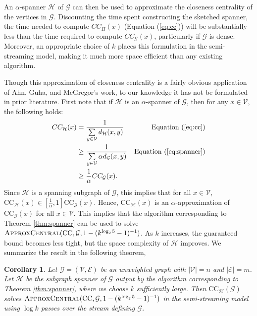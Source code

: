 \documentclass{report}
\newtheorem{corollary}[theorem]{Corollary}
\newcommand{\algoname}[1]{\textnormal{\textsc{#1}}}
\begin{document}
An $\alpha$-spanner $\mathcal{H}$ of $\mathcal{G}$ can then be used to approximate the closeness centrality of the vertices in $\mathcal{G}$.
Discounting the time spent constructing the sketched spanner, the time needed to compute $CC_H(x)$ (Equation (\ref{eq:cc})) will be substantially less than the time required to compute $CC_\mathcal{G}(x)$, particularly if $\mathcal{G}$ is dense. 
Moreover, an appropriate choice of $k$ places this formulation in the semi-streaming model, making it much more space efficient than any existing algorithm.

Though this approximation of closeness centrality is a fairly obvious application of Ahn, Guha, and McGregor's work, to our knowledge it has not be formulated in prior literature. 
First note that if $\mathcal{H}$ is an $\alpha$-spanner of $\mathcal{G}$, then for any $x \in \mathcal{V}$, the following holds:
%
\begin{align*}
CC_\mathcal{H}(x) 
&= \frac{1}{\sum\limits_{y \in \mathcal{V}} d_\mathcal{H}(x,y)}
&\textrm{Equation (\ref{eq:cc}})\\
&\geq \frac{1}{\sum\limits_{y \in \mathcal{V}} \alpha d_\mathcal{G}(x,y)}
&\textrm{Equation (\ref{eq:spanner}})\\
&\geq \frac{1}{\alpha}CC_\mathcal{G}(x).
\end{align*}
%
Since $\mathcal{H}$ is a spanning subgraph of $\mathcal{G}$, this implies that for all $x \in \mathcal{V}$, $\textrm{CC}_\mathcal{H}(x) \in [\frac{1}{\alpha},1]\textrm{CC}_\mathcal{G}(x)$. 
Hence, $\textrm{CC}_\mathcal{H}(x)$ is an $\alpha$-approximation of $\textrm{CC}_\mathcal{G}(x)$ for all $x \in \mathcal{V}$. 
This implies that the algorithm corresponding to Theorem \ref{thm:spanner} can be used to solve $\algoname{ApproxCentral}(\textrm{CC}, \mathcal{G}, 1- (k^{\log_2 5}-1)^{-1})$.
As $k$ increases, the guaranteed bound becomes less tight, but the space complexity of $\mathcal{H}$ improves. 
We summarize the result in the following theorem,
%
\begin{corollary} \label{cor:ccapprox}
Let $\mathcal{G} = (\mathcal{V}, \mathcal{E})$ be an unweighted graph with $|\mathcal{V}| = n$ and $|\mathcal{E}|=m$. 
Let $\mathcal{H}$ be the subgraph spanner of $\mathcal{G}$ output by the algorithm corresponding to Theorem \ref{thm:spanner}, where we choose $k$ sufficiently large.
Then $\textrm{CC}_\mathcal{H}(\mathcal{G})$ solves $\algoname{ApproxCentral}(\textrm{CC},\mathcal{G}, 1- (k^{\log_2 5}-1)^{-1})$ in the semi-streaming model using $\log k$ passes over the stream defining $\mathcal{G}$.
\end{corollary}
\end{document}
